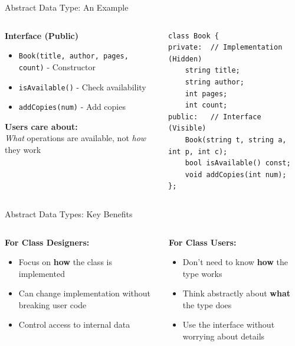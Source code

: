 \begin{frame}[fragile]{Abstract Data Type: An Example}
	\begin{columns}
		\begin{column}{0.5\textwidth}
			\textbf{Interface (Public)}
			\begin{itemize}
				\item \texttt{Book(title, author, pages, count)} - Constructor
				\item \texttt{isAvailable()} - Check availability
				\item \texttt{addCopies(num)} - Add copies
			\end{itemize}
			\vspace{0.3em}
			\textbf{Users care about:} \\
			\textit{What} operations are available, not \textit{how} they work
		\end{column}
		\begin{column}{0.5\textwidth}
			\begin{verbatim}
class Book {
private:  // Implementation (Hidden)
    string title;
    string author;
    int pages;
    int count;
public:   // Interface (Visible)
    Book(string t, string a, int p, int c);
    bool isAvailable() const;
    void addCopies(int num);
};
            \end{verbatim}
		\end{column}
	\end{columns}
\end{frame}

\begin{frame}[fragile]{Abstract Data Types: Key Benefits}

	\begin{columns}
		\begin{column}{0.5\textwidth}
			\textbf{For Class Designers:}
			\begin{itemize}
				\item Focus on \textbf{how} the class is implemented
				\item Can change implementation without breaking user code
				\item Control access to internal data
			\end{itemize}
		\end{column}
		\begin{column}{0.5\textwidth}
			\textbf{For Class Users:}
			\begin{itemize}
				\item Don't need to know \textbf{how} the type works
				\item Think abstractly about \textbf{what} the type does
				\item Use the interface without worrying about details
			\end{itemize}
		\end{column}
	\end{columns}
\end{frame}

